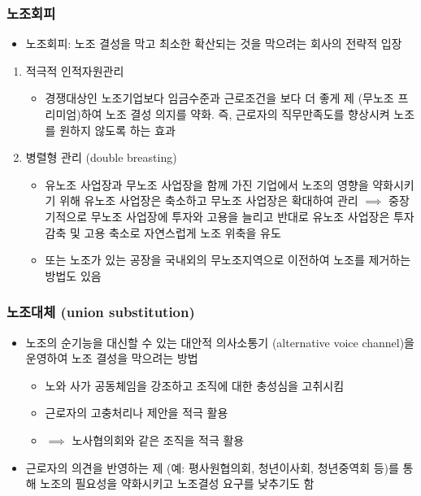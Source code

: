 \documentclass[aspectratio=169,xcolor=dvipsnames,handout]{beamer}
\begin{document}
\begin{frame}[allowframebreaks]
    \frametitle{노조회피}
    \begin{itemize}
            \item 노조회피: 노조 결성을 막고 최소한 확산되는 것을 막으려는 회사의 전략적 입장
    \end{itemize}
    \begin{enumerate}[<+->]
        \item  적극적 인적자원관리
        \begin{itemize}
            \item 경쟁대상인 노조기업보다 임금수준과 근로조건을 보다 더 좋게 제 (무노조 프리미엄)하여 노조 결성 의지를 약화. 즉, 근로자의 직무만족도를 향상시켜 노조를 원하지 않도록 하는 효과
        \end{itemize}
        \framebreak%
        \item  병렬형 관리 (double breasting)
        \begin{itemize}
            \item 유노조 사업장과 무노조 사업장을 함께 가진 기업에서 노조의 영향을 약화시키기 위해 유노조 사업장은 축소하고 무노조 사업장은 확대하여 관리 $\implies$ 중장기적으로 무노조 사업장에 투자와 고용을 늘리고 반대로 유노조 사업장은 투자 감축 및 고용 축소로 자연스럽게 노조 위축을 유도
        \item 또는 노조가 있는 공장을 국내외의 무노조지역으로 이전하여 노조를 제거하는 방법도 있음
        \end{itemize}
    \end{enumerate}
\end{frame}

\begin{frame}
    \frametitle{노조대체 (union substitution)}
    \begin{itemize}[<+->]
        \item 노조의 순기능을 대신할 수 있는 대안적 의사소통기 (alternative voice channel)을 운영하여 노조 결성을 막으려는 방법
        \begin{itemize}
            \item 노와 사가 공동체임을 강조하고 조직에 대한 충성심을 고취시킴
            \item 근로자의 고충처리나 제안을 적극 활용
            \item $\implies$ 노사협의회와 같은 조직을 적극 활용
        \end{itemize}
        \item 근로자의 의견을 반영하는 제 (예: 평사원협의회, 청년이사회, 청년중역회 등)를 통해 노조의 필요성을 약화시키고 노조결성 요구를 낮추기도 함
    \end{itemize}
\end{frame}
\end{document}

